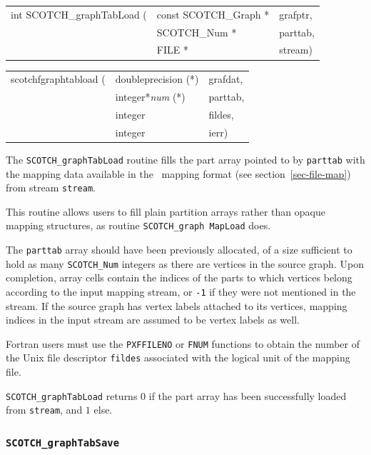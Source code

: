 \begin{itemize}
\progsyn

{\tt\begin{tabular}{l@{}ll}
int SCOTCH\_graphTabLoad ( & const SCOTCH\_Graph * & grafptr, \\
                           & SCOTCH\_Num *         & parttab, \\
                           & FILE *                & stream)
\end{tabular}}

{\tt\begin{tabular}{l@{}ll}
scotchfgraphtabload ( & doubleprecision (*)   & grafdat, \\
                      & integer*{\it num} (*) & parttab, \\
                      & integer               & fildes, \\
                      & integer               & ierr)
\end{tabular}}

\progdes

The {\tt SCOTCH\_graphTabLoad} routine fills the part array pointed to
by {\tt parttab} with the mapping data available in the
\scotch\ mapping format (see section~\ref{sec-file-map})
from stream {\tt stream}.

This routine allows users to fill plain partition arrays rather than
opaque mapping structures, as routine {\tt SCOTCH\_\lbt graph\lbt
Map\lbt Load} does.

The {\tt parttab} array should have been previously allocated, of a
size sufficient to hold as many {\tt SCOTCH\_\lbt Num} integers as
there are vertices in the source graph. Upon completion, array cells
contain the indices of the parts to which vertices belong according to
the input mapping stream, or {\tt -1} if they were not mentioned in
the stream. If the source graph has vertex labels attached to its
vertices, mapping indices in the input stream are assumed to be vertex
labels as well.

Fortran users must use the {\tt PXFFILENO} or {\tt FNUM} functions to
obtain the number of the Unix file descriptor {\tt fildes} associated
with the logical unit of the mapping file.

\progret

{\tt SCOTCH\_graphTabLoad} returns $0$ if the part array
has been successfully loaded from {\tt stream}, and $1$ else.
\end{itemize}

\subsubsection{{\tt SCOTCH\_graphTabSave}}
\label{sec-lib-graph-tab-load}

